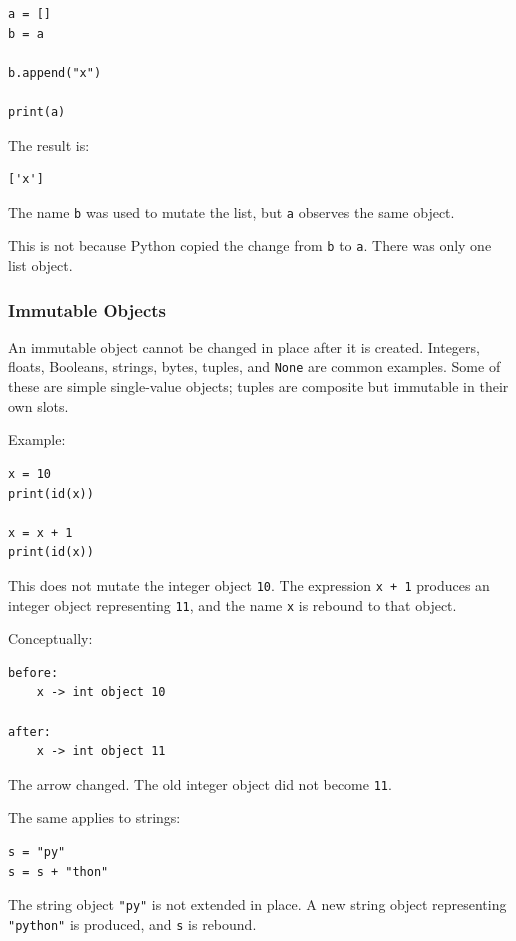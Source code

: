 \begin{verbatim}
a = []
b = a

b.append("x")

print(a)
\end{verbatim}

The result is:

\begin{verbatim}
['x']
\end{verbatim}

The name \texttt{b} was used to mutate the list, but \texttt{a} observes the same object.

This is not because Python copied the change from \texttt{b} to \texttt{a}. There was only one list object.

\subsubsection*{Immutable Objects}

An immutable object cannot be changed in place after it is created. Integers, floats, Booleans, strings, bytes, tuples, and \texttt{None} are common examples. Some of these are simple single-value objects; tuples are composite but immutable in their own slots.

Example:

\begin{verbatim}
x = 10
print(id(x))

x = x + 1
print(id(x))
\end{verbatim}

This does not mutate the integer object \texttt{10}. The expression \texttt{x + 1} produces an integer object representing \texttt{11}, and the name \texttt{x} is rebound to that object.

Conceptually:

\begin{verbatim}
before:
    x -> int object 10

after:
    x -> int object 11
\end{verbatim}

The arrow changed. The old integer object did not become \texttt{11}.

The same applies to strings:

\begin{verbatim}
s = "py"
s = s + "thon"
\end{verbatim}

The string object \texttt{"py"} is not extended in place. A new string object representing \texttt{"python"} is produced, and \texttt{s} is rebound.

